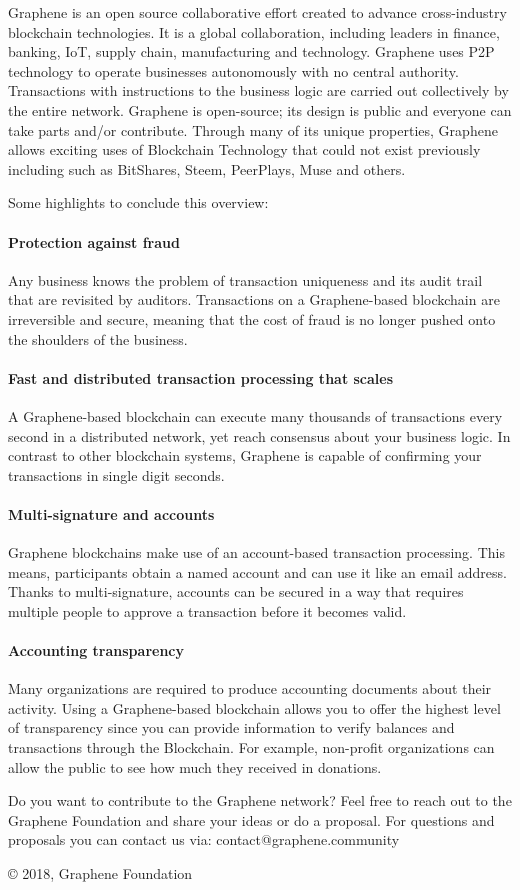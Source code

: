 Graphene is an open source collaborative effort created to advance
cross-industry blockchain technologies. It is a global collaboration,
including leaders in finance, banking, IoT, supply chain, manufacturing
and technology.
Graphene uses P2P technology to operate businesses autonomously
with no central authority. Transactions with instructions to the
business logic are carried out collectively by the entire network.
Graphene is open-source; its design is public and everyone can take
parts and/or contribute. Through many of its unique properties, Graphene allows exciting
uses of Blockchain Technology that could not exist previously including
such as BitShares, Steem, PeerPlays, Muse and others.

Some highlights to conclude this overview:

\paragraph{Protection against fraud}
Any business knows the problem of transaction uniqueness and its audit
trail that are revisited by auditors. Transactions on a Graphene-based
blockchain are irreversible and secure, meaning that the cost of fraud
is no longer pushed onto the shoulders of the business.

\paragraph{Fast and distributed transaction processing that scales}
A Graphene-based blockchain can execute many thousands of transactions
every second in a distributed network, yet reach consensus about your
business logic. In contrast to other blockchain systems, Graphene is
capable of confirming your transactions in single digit seconds.

\paragraph{Multi-signature and accounts}
Graphene blockchains make use of an account-based transaction
processing. This means, participants obtain a named account and can use
it like an email address. Thanks to multi-signature, accounts can be
secured in a way that requires multiple people to approve a transaction
before it becomes valid.

\paragraph{Accounting transparency}
Many organizations are required to produce accounting documents about
their activity. Using a Graphene-based blockchain allows you to offer
the highest level of transparency since you can provide information to
verify balances and transactions through the Blockchain. For example,
non-profit organizations can allow the public to see how much they
received in donations.

Do you want to contribute to the Graphene network? Feel free to reach out to the Graphene Foundation and share your ideas or do a proposal. For questions and proposals you can contact us via: contact@graphene.community
 
 © 2018, Graphene Foundation
